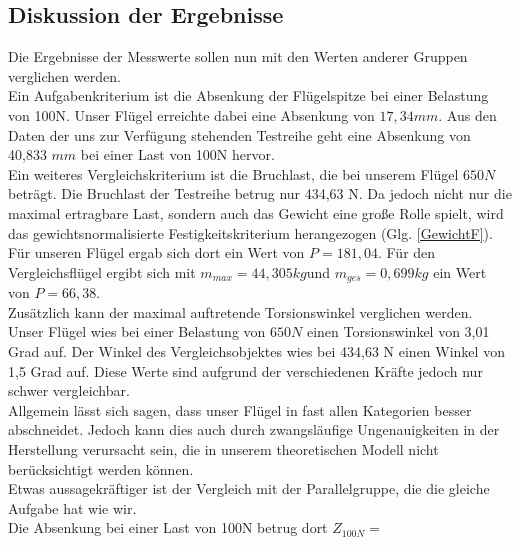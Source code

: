\subsection{Diskussion der Ergebnisse}
Die Ergebnisse der Messwerte sollen nun mit den Werten anderer Gruppen verglichen werden.\\
\noindent
Ein Aufgabenkriterium ist die Absenkung der Flügelspitze bei einer Belastung von 100N. Unser Flügel erreichte dabei eine Absenkung von $17,34mm$. Aus den Daten der uns zur Verfügung stehenden Testreihe geht eine Absenkung von 40,833 $mm$ bei einer Last von 100N hervor.\\
\noindent
Ein weiteres Vergleichskriterium ist die Bruchlast, die bei unserem Flügel $ 650N $ beträgt. Die Bruchlast der Testreihe betrug nur 434,63 N. Da jedoch nicht nur die maximal ertragbare Last, sondern auch das Gewicht eine große Rolle spielt, wird das gewichtsnormalisierte Festigkeitskriterium herangezogen (Glg. \ref{GewichtF}). Für unseren Flügel ergab sich dort ein Wert von $P=181,04$. Für den Vergleichsflügel ergibt sich mit $m_{max}=44,305kg$und $m_{ges}=0,699kg$ ein Wert von $P=66,38$.\\
\noindent
Zusätzlich kann der maximal auftretende Torsionswinkel verglichen werden. Unser Flügel wies bei einer Belastung von $ 650N $ einen Torsionswinkel von 3,01 Grad auf. Der Winkel des Vergleichsobjektes wies bei 434,63 N einen Winkel von 1,5 Grad auf. Diese Werte sind aufgrund der verschiedenen Kräfte jedoch nur schwer vergleichbar.\\
Allgemein lässt sich sagen, dass unser Flügel in fast allen Kategorien besser abschneidet. Jedoch kann dies auch durch zwangsläufige Ungenauigkeiten in der Herstellung verursacht sein, die in unserem theoretischen Modell nicht berücksichtigt werden können.\\
\noindent
Etwas aussagekräftiger ist der Vergleich mit der Parallelgruppe, die die gleiche Aufgabe hat wie wir.\\
\noindent
Die Absenkung bei einer Last von 100N betrug dort $Z_{100N}=$


